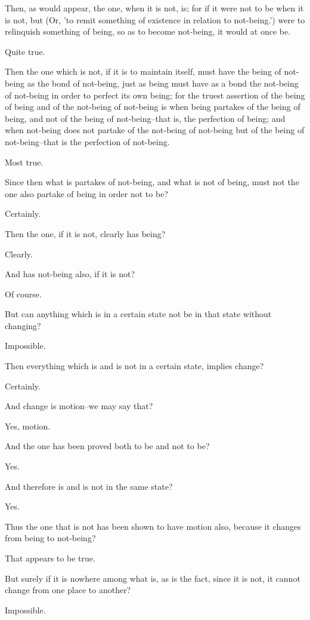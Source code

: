 Then, as would appear, the one, when it is not, is; for if it were
not to be when it is not, but (Or, 'to remit something of existence in
relation to not-being.') were to relinquish something of being, so as to
become not-being, it would at once be.

Quite true.

Then the one which is not, if it is to maintain itself, must have the
being of not-being as the bond of not-being, just as being must have as
a bond the not-being of not-being in order to perfect its own being;
for the truest assertion of the being of being and of the not-being of
not-being is when being partakes of the being of being, and not of the
being of not-being--that is, the perfection of being; and when not-being
does not partake of the not-being of not-being but of the being of
not-being--that is the perfection of not-being.

Most true.

Since then what is partakes of not-being, and what is not of being, must
not the one also partake of being in order not to be?

Certainly.

Then the one, if it is not, clearly has being?

Clearly.

And has not-being also, if it is not?

Of course.

But can anything which is in a certain state not be in that state
without changing?

Impossible.

Then everything which is and is not in a certain state, implies change?

Certainly.

And change is motion--we may say that?

Yes, motion.

And the one has been proved both to be and not to be?

Yes.

And therefore is and is not in the same state?

Yes.

Thus the one that is not has been shown to have motion also, because it
changes from being to not-being?

That appears to be true.

But surely if it is nowhere among what is, as is the fact, since it is
not, it cannot change from one place to another?

Impossible.

